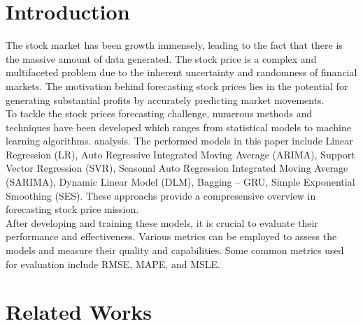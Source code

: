 \documentclass{ieeeojies}
\begin{document}
\section{Introduction}
\label{sec:introduction}
The stock market has been growth immensely, leading to the fact that there is the massive amount of data generated. The stock price is a complex and multifaceted problem due to the inherent uncertainty and randomness of financial markets. The motivation behind forecasting stock prices lies in the potential for generating substantial profits by accurately predicting market movements.
\\To tackle the stock prices forecasting challenge, numerous methods and techniques have been developed which ranges from statistical models to machine learning algorithms. analysis. The performed models in this paper include Linear Regression (LR), Auto Regressive Integrated Moving Average (ARIMA), Support Vector Regression (SVR), Seasonal Auto Regression Integrated Moving Average (SARIMA), Dynamic Linear Model (DLM), Bagging – GRU, Simple Exponential Smoothing (SES). These approachs provide a compresensive overview in forecasting stock price mission.
\\After developing and training these models, it is crucial to evaluate their performance and effectiveness. Various metrics can be employed to assess the models and measure their quality and capabilities. Some common metrics used for evaluation include RMSE, MAPE, and MSLE.

\section{Related Works}
\end{document}
